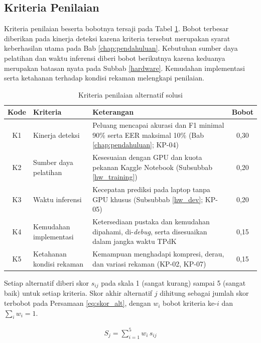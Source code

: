 \subsection{Kriteria Penilaian}
\label{kriteria_alt}

Kriteria penilaian beserta bobotnya tersaji pada Tabel \ref{tab:kriteria_alt}. Bobot terbesar diberikan pada kinerja deteksi karena kriteria tersebut merupakan syarat keberhasilan utama pada Bab \ref{chap:pendahuluan}. Kebutuhan sumber daya pelatihan dan waktu inferensi diberi bobot berikutnya karena keduanya merupakan batasan nyata pada Subbab \ref{hardware}. Kemudahan implementasi serta ketahanan terhadap kondisi rekaman melengkapi penilaian.

\begin{table}[t]
  \centering
  \small
  \caption{Kriteria penilaian alternatif solusi}
  \label{tab:kriteria_alt}
  \renewcommand{\arraystretch}{1.25}
  \begin{tabularx}{\textwidth}{| c | l | X | c |}
    \hline
    \textbf{Kode} & \textbf{Kriteria} & \textbf{Keterangan} & \textbf{Bobot} \\
    \hline
    K1 & Kinerja deteksi & Peluang mencapai akurasi dan F1 minimal 90\% serta EER maksimal 10\% (Bab \ref{chap:pendahuluan}; KP-04) & 0,30 \\
    K2 & Sumber daya pelatihan & Kesesuaian dengan GPU dan kuota pekanan Kaggle Notebook (Subsubbab \ref{hw_training}) & 0,20 \\
    K3 & Waktu inferensi & Kecepatan prediksi pada laptop tanpa GPU khusus (Subsubbab \ref{hw_dev}; KP-05) & 0,20 \\
    K4 & Kemudahan implementasi & Ketersediaan pustaka dan kemudahan dipahami, di-\textit{debug}, serta disesuaikan dalam jangka waktu TPdK & 0,15 \\
    K5 & Ketahanan kondisi rekaman & Kemampuan menghadapi kompresi, derau, dan variasi rekaman (KP-02, KP-07) & 0,15 \\
    \hline
  \end{tabularx}
\end{table}

Setiap alternatif diberi skor $s_{ij}$ pada skala 1 (sangat kurang) sampai 5 (sangat baik) untuk setiap kriteria. Skor akhir alternatif $j$ dihitung sebagai jumlah skor terbobot pada Persamaan \ref{eq:skor_alt}, dengan $w_i$ bobot kriteria ke-$i$ dan $\sum_i w_i = 1$.

\begin{align}
  S_j = \sum_{i=1}^{5} w_i \, s_{ij}
  \label{eq:skor_alt}
\end{align}

